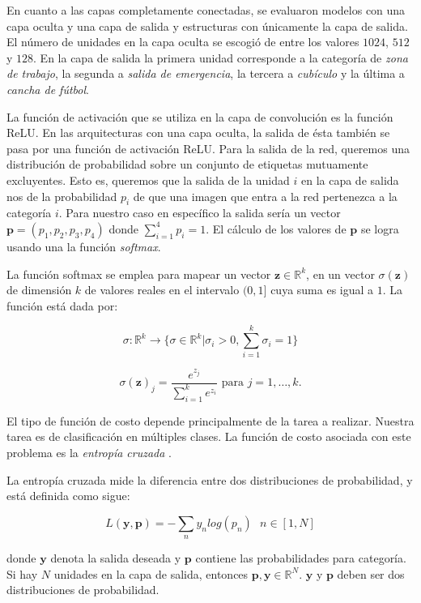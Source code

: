 En cuanto a las capas completamente conectadas, se evaluaron
modelos con una capa oculta y una capa de salida y estructuras
con únicamente la capa de salida. El número de unidades 
en la capa oculta se escogió de entre los valores $1024$,
$512$ y $128$. En la capa de salida la primera unidad corresponde a la
categoría de \textit{zona de trabajo}, la segunda a 
\textit{salida de emergencia}, la tercera a \textit{cubículo}
y la última a \textit{cancha de fútbol}.

La función de activación que se utiliza en la capa de
convolución es la función ReLU. En las arquitecturas con
una capa oculta, la salida de ésta también se pasa 
por una función de activación ReLU. Para la salida 
de la red, queremos una distribución de probabilidad
sobre un conjunto de etiquetas mutuamente excluyentes.
Esto es, queremos que la salida de la unidad $i$ en la capa
de salida nos de la probabilidad $p_i$ de que una imagen que
entra
a la red pertenezca a la categoría $i$. Para nuestro caso en específico
la salida sería un vector $\mathbf{p} = (p_1, p_2, p_3, p_4)$ donde $\sum_{i = 1}^4 p_i = 1$.
El cálculo de los valores de $\mathbf{p}$  se logra usando una la función \textit{softmax}.\\

\begin{remark}

La función softmax se emplea para mapear un vector $\mathbf{z} \in \mathbb{R}^k$,  en un vector $\sigma(\mathbf{z})$ de dimensión $k$ de valores reales en el intervalo $(0, 1]$ cuya suma es igual a $1$. La función está dada por: 
\end{remark}

\[
\sigma : \mathbb{R}^k \rightarrow \bigg \{ \sigma \in \mathbb{R}^k | \sigma_i > 0, \sum_{i=1}^k \sigma_i = 1 \bigg \}
\]

\[
\sigma(\mathbf{z})_j = \frac{e^{z_j}}{\sum_{i=1}^k e^{z_i}} \text{ para  } j=1,\dots,k.
\]
%

El tipo de función de costo depende principalmente de la tarea a realizar. Nuestra tarea es de clasificación en múltiples clases. La función
de costo asociada con este problema es la \textit{entropía cruzada} \cite{ragavvenkatesanbaoxinli2018}.\\

\begin{remark}
La entropía cruzada mide la diferencia entre dos distribuciones de probabilidad, y está
definida como sigue:

\[
L(\mathbf{y}, \mathbf{p}) = - \sum_{n} y_n log(p_n) \text{		} n \in [1,N]
\]

donde $\mathbf{y}$ denota la salida deseada y $\mathbf{p}$ contiene las probabilidades
para categoría. Si hay $N$ unidades en la capa de salida, entonces
$\mathbf{p}, \mathbf{y} \in \mathbb{R}^N$. $\mathbf{y}$ y $\mathbf{p}$ deben ser dos distribuciones de probabilidad.
\end{remark}


